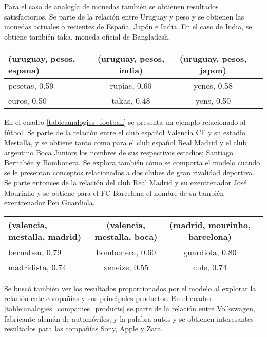 Para el caso de analogía de monedas también se obtienen resultados satisfactorios. Se parte de
la relación entre Uruguay y peso y se obtienen las monedas actuales o recientes de España, Japón
e India. En el caso de India, se obtiene también taka, moneda oficial de Bangladesh.

\begin{table*}[ht]
    \centering
    \begin{tabular}{lccc}
        \hline
        (uruguay, pesos, espana) & (uruguay, pesos, india) & (uruguay, pesos, japon)\\
        \hline
        pesetas, 0.59 & rupias, 0.60 & yenes, 0.58\\
        euros, 0.50 & takas, 0.48 & yens, 0.50\\
        \hline
    \end{tabular}
    \caption{Analogías para países y monedas.}
    \label{table:analogies_currencies}
\end{table*}

En el cuadro \ref{table:analogies_football} se presenta un ejemplo relacionado al fútbol. Se
parte de la relación entre el club español Valencia CF y su estadio Mestalla, y se obtiene tanto
como para el club español Real Madrid y el club argentino Boca Juniors los nombres de sus
respectivos estadios; Santiago Bernabéu y Bombonera. Se explora también cómo se
comporta el modelo cuando se le presentan conceptos relacionados a dos clubes de gran
rivalidad deportiva. Se parte entonces de la relación del club Real Madrid y su exentrenador
José Mourinho y se obtiene para el FC Barcelona el nombre de su también exentrenador Pep
Guardiola.

\begin{table*}[ht]
    \centering
    \begin{tabular}{lccc}
        \hline
        (valencia, mestalla, madrid) & (valencia, mestalla, boca) & (madrid, mourinho, barcelona)\\
        \hline
        bernabeu, 0.79 & bombonera, 0.60 & guardiola, 0.80\\
        madridista, 0.74 & xeneize, 0.55 & cule, 0.74\\
        \hline
    \end{tabular}
    \caption{Analogías relacionadas al fútbol.}
    \label{table:analogies_football}
\end{table*}

Se buscó también ver los resultados proporcionados por el modelo al explorar la relación
ente compañías y sus principales productos. En el cuadro
\ref{table:analogies_companies_products} se parte de la relación entre Volkswagen, fabricante
alemán de automóviles, y la palabra autos y se obtienen interesantes resultados para las
compañías Sony, Apple y Zara.

